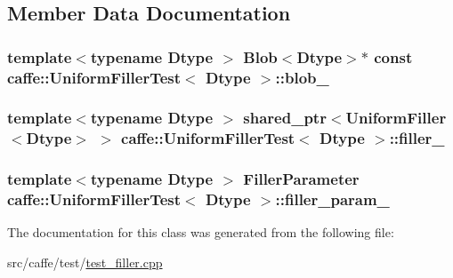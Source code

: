 \subsection{Member Data Documentation}
\hypertarget{classcaffe_1_1_uniform_filler_test_ad11a8f8e30835ae07340deb3663a21cc}{
\subsubsection[{blob\+\_\+}]{\setlength{\rightskip}{0pt plus 5cm}template$<$typename Dtype $>$ {\bf Blob}$<$Dtype$>$$\ast$ const {\bf caffe\+::\+Uniform\+Filler\+Test}$<$ Dtype $>$\+::blob\+\_\+\hspace{0.3cm}{\ttfamily [protected]}}}\label{classcaffe_1_1_uniform_filler_test_ad11a8f8e30835ae07340deb3663a21cc}
\hypertarget{classcaffe_1_1_uniform_filler_test_a0f449053d9c3cd3103c2aa4fe807c9dc}{
\subsubsection[{filler\+\_\+}]{\setlength{\rightskip}{0pt plus 5cm}template$<$typename Dtype $>$ shared\+\_\+ptr$<${\bf Uniform\+Filler}$<$Dtype$>$ $>$ {\bf caffe\+::\+Uniform\+Filler\+Test}$<$ Dtype $>$\+::filler\+\_\+\hspace{0.3cm}{\ttfamily [protected]}}}\label{classcaffe_1_1_uniform_filler_test_a0f449053d9c3cd3103c2aa4fe807c9dc}
\hypertarget{classcaffe_1_1_uniform_filler_test_a1639040ac615a5a4a13df866159aa041}{
\subsubsection[{filler\+\_\+param\+\_\+}]{\setlength{\rightskip}{0pt plus 5cm}template$<$typename Dtype $>$ Filler\+Parameter {\bf caffe\+::\+Uniform\+Filler\+Test}$<$ Dtype $>$\+::filler\+\_\+param\+\_\+\hspace{0.3cm}{\ttfamily [protected]}}}\label{classcaffe_1_1_uniform_filler_test_a1639040ac615a5a4a13df866159aa041}


The documentation for this class was generated from the following file\+:\begin{DoxyCompactItemize}
\item 
src/caffe/test/\hyperlink{test__filler_8cpp}{test\+\_\+filler.\+cpp}\end{DoxyCompactItemize}
